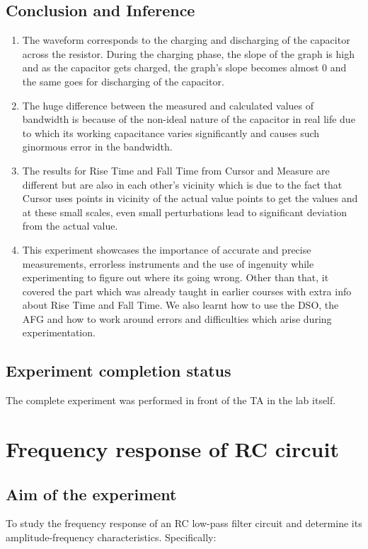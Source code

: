 \documentclass[12pt]{article}
\begin{document}
\subsection{Conclusion and Inference}
\begin{enumerate}
\item The waveform corresponds to the charging and discharging of the capacitor across the resistor. During the charging phase, the slope of the graph is high and as the capacitor gets charged, the graph's slope becomes almost 0 and the same goes for discharging of the capacitor.
\item The huge difference between the measured and calculated values of bandwidth is because of the non-ideal nature of the capacitor in real life due to which its working capacitance varies significantly and causes such ginormous error in the bandwidth.
\item The results for Rise Time and Fall Time from Cursor and Measure are different but are also in each other's vicinity which is due to the fact that Cursor uses points in vicinity of the actual value points to get the values and at these small scales, even small perturbations lead to significant deviation from the actual value.
\item This experiment showcases the importance of accurate and precise measurements, errorless instruments and the use of ingenuity while experimenting to figure out where its going wrong. Other than that, it covered the part which was already taught in earlier courses with extra info about Rise Time and Fall Time. We also learnt how to use the DSO, the AFG and how to work around errors and difficulties which arise during experimentation. 
\end{enumerate}


\subsection{Experiment completion status}
The complete experiment was performed in front of the TA in the lab itself.


\newpage
\section{Frequency response of RC circuit}
\subsection{Aim of the experiment}
To study the frequency response of an RC low-pass filter circuit and determine its amplitude-frequency characteristics. Specifically:
\end{document}
